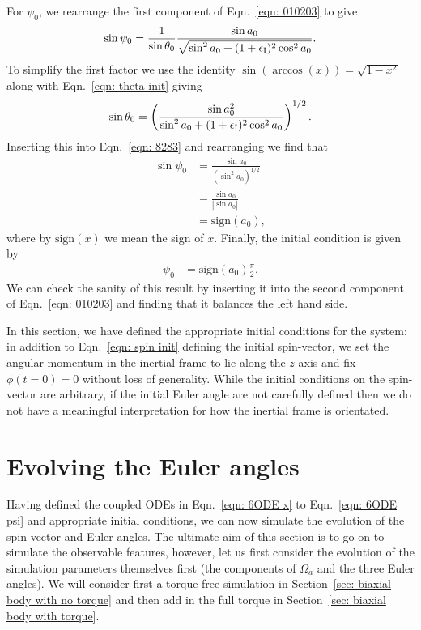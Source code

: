 \documentclass[../full_thesis/full_thesis.tex]{subfiles}
\begin{document}
For $\psi_0$, we rearrange the first component of Eqn.~\eqref{eqn: 010203} to
give
\begin{equation}
\sin\psi_{0} =\frac{1}{ \sin\theta_{0}}
\frac{\sin a_{0}}{\sqrt{\sin^2 a_{0} + (1+\epsilon_{\mathrm{I}})^2 \cos^2 a_{0}}}.
\label{eqn: 8283}
\end{equation}
To simplify the first factor we use the identity $\sin(\arccos(x)) = \sqrt{1 - x^{2}}$
along with Eqn.~\eqref{eqn:  theta init} giving
\begin{equation}
\sin\theta_{0} = \left(\frac{\sin a_{0}^{2}}
                  {\sin^2 a_{0} + (1+\epsilon_{\mathrm{I}})^2 \cos^2 a_{0}} \right)^{1/2}.
\end{equation}
Inserting this into Eqn.~\eqref{eqn: 8283} and rearranging we find that
\begin{align}
\sin \psi_0 & = \frac{\sin a_{0}}{\left(\sin^{2} a_{0}\right)^{1/2}} \\
 & = \frac{\sin a_{0} }{|\sin a_{0}|} \\
& = \mathrm{sign}(a_{0}),
\end{align}
where by $\mathrm{sign}(x)$ we mean the sign of $x$. Finally, the initial
condition is given by
\begin{align}
\psi_{0} & =\mathrm{sign}(a_{0}) \frac{\pi}{2}.
\label{eqn: psi  init}
\end{align}
We can check the sanity of this result by inserting it into the second component of
Eqn.~\eqref{eqn: 010203} and finding that it balances the left hand side.

In this section, we have defined the appropriate initial conditions for the
system: in addition to Eqn.~\eqref{eqn: spin init} defining the initial spin-vector,
we set the angular momentum in the inertial frame to lie along the
$z$ axis and fix $\phi(t=0)=0$ without loss of generality.  While the
initial conditions on the spin-vector are arbitrary, if the initial Euler angle
are not carefully defined then we do not have a meaningful interpretation for
how the inertial frame is orientated.

\section{Evolving the Euler angles}
\label{sec: evolving the euler angles}

Having defined the coupled ODEs in Eqn.~\eqref{eqn: 6ODE x} to Eqn.~\eqref{eqn:
6ODE psi} and appropriate initial conditions, we can now simulate the evolution
of the spin-vector and Euler angles. The ultimate aim of this section is to go
on to simulate the observable features, however, let us first consider the
evolution of the simulation parameters themselves first (the components of
$\Omega_a$ and the three Euler angles). We will consider first a torque free
simulation in Section~\ref{sec: biaxial body with no torque} and then add in
the full torque in Section~\ref{sec: biaxial body with torque}.
\end{document}
